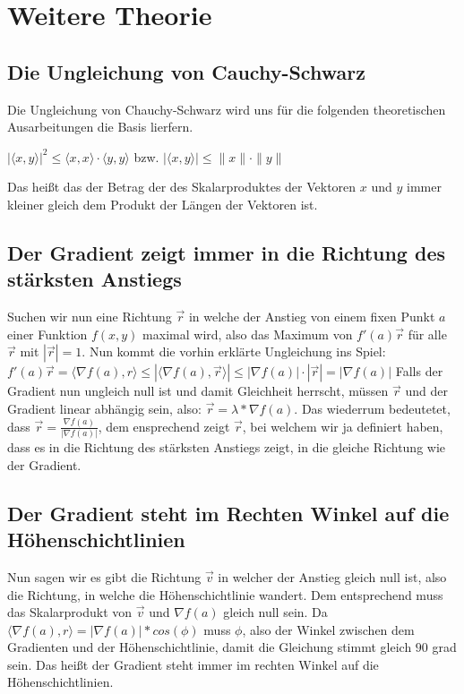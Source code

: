 \documentclass[a4paper, 11pt]{article}
\begin{document}
\section{Weitere Theorie}
\subsection{Die Ungleichung von  Cauchy-Schwarz}
Die Ungleichung von Chauchy-Schwarz wird uns für die folgenden theoretischen Ausarbeitungen die Basis lierfern.

$|\langle x,y \rangle|^2 \leq \langle x, x\rangle \cdot \langle y,y\rangle$ bzw. $\left|\langle x,y \rangle\right| \leq \|x\| \cdot \| y\|$

Das heißt das der Betrag der des Skalarproduktes der Vektoren $x$ und $y$ immer kleiner gleich dem Produkt der Längen der Vektoren ist.
\subsection{Der Gradient zeigt immer in die Richtung des stärksten Anstiegs}
Suchen wir nun eine Richtung ${\overrightarrow{r}}$ in welche der Anstieg von einem fixen Punkt $a$ einer Funktion $f(x,y)$  maximal wird, also das Maximum von $f'(a){\overrightarrow{r}}$ für alle ${\overrightarrow{r}}$ mit $|{\overrightarrow{r}}|=1$. Nun kommt die vorhin erklärte Ungleichung ins Spiel:
$f'(a){\overrightarrow{r}}={\langle}{\nabla}f(a),r{\rangle} {\leq} |{\langle}{\nabla}f(a),{\overrightarrow{r}}{\rangle}| {\leq} |{\nabla}f(a)|{\cdot}|{\overrightarrow{r}}|=|{\nabla}f(a)|$
Falls der Gradient nun ungleich null ist und damit Gleichheit herrscht, müssen ${\overrightarrow{r}}$ und der Gradient linear abhängig sein, also: ${\overrightarrow{r}}={\lambda}*{\nabla}f(a)$. Das wiederrum bedeutetet, dass ${\overrightarrow{r}}=\frac{{\nabla}f(a)}{|{\nabla}f(a)|}$, dem ensprechend zeigt ${\overrightarrow{r}}$, bei welchem wir ja definiert haben, dass es in die Richtung des stärksten Anstiegs zeigt, in die gleiche Richtung wie der Gradient.

\subsection{Der Gradient steht im Rechten Winkel auf die Höhenschichtlinien}
Nun sagen wir es gibt die Richtung ${\overrightarrow{v}}$ in welcher der Anstieg gleich null ist, also die Richtung, in welche die Höhenschichtlinie wandert. Dem entsprechend muss das Skalarprodukt von ${\overrightarrow{v}}$ und ${\nabla}f(a)$ gleich null sein. Da ${\langle}{\nabla}f(a),r{\rangle} = |{\nabla}f(a)| * cos({\phi})$ muss ${\phi}$, also der Winkel zwischen dem Gradienten und der Höhenschichtlinie, damit die Gleichung stimmt gleich $90$ grad sein. Das heißt der Gradient steht immer im rechten Winkel auf die Höhenschichtlinien.
\end{document}
